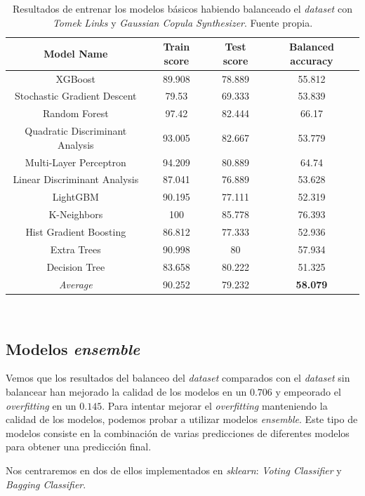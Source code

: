 \begin{table}[!h]
    \centering
    \begin{tabular}{|c|ccc|}\hline
        Model Name & Train score & Test score & Balanced accuracy \\ \hline
        XGBoost & 89.908 & 78.889 & 55.812 \\ 
        Stochastic Gradient Descent & 79.53 & 69.333 & 53.839 \\ 
        Random Forest & 97.42 & 82.444 & 66.17 \\ 
        Quadratic Discriminant Analysis & 93.005 & 82.667 & 53.779 \\ 
        Multi-Layer Perceptron & 94.209 & 80.889 & 64.74 \\ 
        Linear Discriminant Analysis & 87.041 & 76.889 & 53.628 \\ 
        LightGBM & 90.195 & 77.111 & 52.319 \\ 
        K-Neighbors & 100 & 85.778 & 76.393 \\ 
        Hist Gradient Boosting & 86.812 & 77.333 & 52.936 \\ 
        Extra Trees & 90.998 & 80 & 57.934 \\ 
        Decision Tree & 83.658 & 80.222 & 51.325 \\ \hline
        \textit{Average} & 90.252 & 79.232 & \textbf{58.079} \\ \hline
    \end{tabular}
    \caption{Resultados de entrenar los modelos básicos habiendo balanceado el \textit{dataset} con \textit{Tomek Links} y \textit{Gaussian Copula Synthesizer}. Fuente propia.}\ \label{tab:balanced-basic-training}
\end{table}

\subsection{Modelos \textit{ensemble}}

Vemos que los resultados del balanceo del \textit{dataset} comparados con el \textit{dataset} sin balancear han mejorado la calidad de los modelos en un $0.706$ y empeorado el \textit{overfitting} en un $0.145$. Para intentar mejorar el \textit{overfitting} manteniendo la calidad de los modelos, podemos probar a utilizar modelos \textit{ensemble}. Este tipo de modelos consiste en la combinación de varias predicciones de diferentes modelos para obtener una predicción final.

Nos centraremos en dos de ellos implementados en \textit{sklearn}: \textit{Voting Classifier} y \textit{Bagging Classifier}. 

